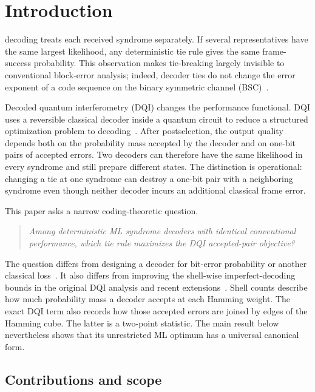 \documentclass[journal]{IEEEtran}
\theoremstyle{definition}
\theoremstyle{remark}
\begin{document}
\section{Introduction}

 decoding treats each received syndrome
separately.  If several representatives have the same largest likelihood,
any deterministic tie rule gives the same frame-success probability.  This
observation makes tie-breaking largely invisible to conventional block-error
analysis; indeed, decoder ties do not change the error exponent of a code
sequence on the binary symmetric channel (BSC)~\cite{chang2021ties,chang2023ties}.

Decoded quantum interferometry (DQI) changes the performance functional.
DQI uses a reversible classical decoder inside a quantum circuit to reduce a
structured optimization problem to decoding~\cite{jordan2025dqi}.  After
postselection, the output quality depends both on the probability mass
accepted by the decoder and on one-bit pairs of accepted errors.  Two
decoders can therefore have the same likelihood in every syndrome and still
prepare different states.  The distinction is operational: changing a tie at
one syndrome can destroy a one-bit pair with a neighboring syndrome even
though neither decoder incurs an additional classical frame error.

This paper asks a narrow coding-theoretic question.

\begin{quote}
\emph{Among deterministic ML syndrome decoders with identical conventional
performance, which tie rule maximizes the DQI accepted-pair objective?}
\end{quote}

The question differs from designing a decoder for bit-error probability or
another classical loss~\cite{kiely1995}.  It also differs from improving the
shell-wise imperfect-decoding bounds in the original DQI analysis and recent
extensions~\cite{jordan2025dqi,gao2026}.  Shell counts describe how much
probability mass a decoder accepts at each Hamming weight.  The exact DQI term
also records how those accepted errors are joined by edges of the Hamming
cube.  The latter is a two-point statistic.
The main result below nevertheless shows that its unrestricted ML optimum has
a universal canonical form.

\subsection{Contributions and scope}
\end{document}
